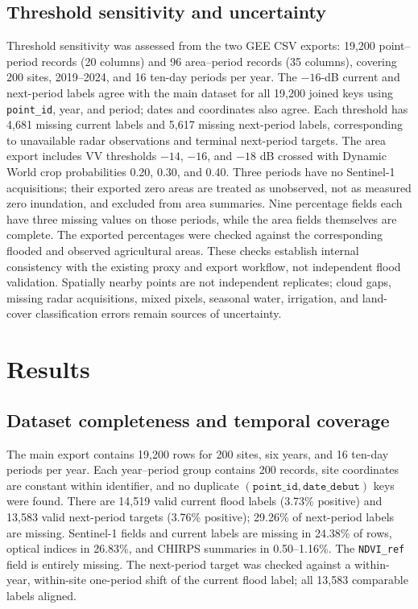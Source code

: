 \documentclass[pdflatex,sn-mathphys,Numbered]{sn-jnl}
\begin{document}
\subsection{Threshold sensitivity and uncertainty}
Threshold sensitivity was assessed from the two GEE CSV exports: 19,200 point--period records (20 columns) and 96 area--period records (35 columns), covering 200 sites, 2019--2024, and 16 ten-day periods per year. The $-16$-dB current and next-period labels agree with the main dataset for all 19,200 joined keys using \texttt{point\_id}, year, and period; dates and coordinates also agree. Each threshold has 4,681 missing current labels and 5,617 missing next-period labels, corresponding to unavailable radar observations and terminal next-period targets. The area export includes VV thresholds $-14$, $-16$, and $-18$ dB crossed with Dynamic World crop probabilities 0.20, 0.30, and 0.40. Three periods have no Sentinel-1 acquisitions; their exported zero areas are treated as unobserved, not as measured zero inundation, and excluded from area summaries. Nine percentage fields each have three missing values on those periods, while the area fields themselves are complete. The exported percentages were checked against the corresponding flooded and observed agricultural areas. These checks establish internal consistency with the existing proxy and export workflow, not independent flood validation. Spatially nearby points are not independent replicates; cloud gaps, missing radar acquisitions, mixed pixels, seasonal water, irrigation, and land-cover classification errors remain sources of uncertainty.

\section{Results}
\subsection{Dataset completeness and temporal coverage}
The main export contains 19,200 rows for 200 sites, six years, and 16 ten-day periods per year. Each year--period group contains 200 records, site coordinates are constant within identifier, and no duplicate $(\texttt{point\_id},\texttt{date\_debut})$ keys were found. There are 14,519 valid current flood labels (3.73\% positive) and 13,583 valid next-period targets (3.76\% positive); 29.26\% of next-period labels are missing. Sentinel-1 fields and current labels are missing in 24.38\% of rows, optical indices in 26.83\%, and CHIRPS summaries in 0.50--1.16\%. The \texttt{NDVI\_ref} field is entirely missing. The next-period target was checked against a within-year, within-site one-period shift of the current flood label; all 13,583 comparable labels aligned.
\end{document}

